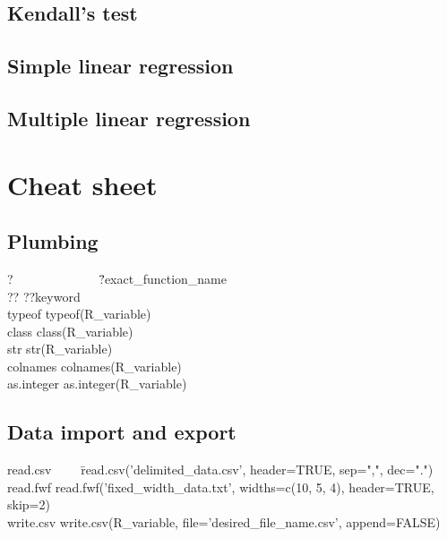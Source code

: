 \documentclass{report}
\begin{document}
	\section{Kendall’s test}
	\section{Simple linear regression}
	\section{Multiple linear regression}

\chapter{Cheat sheet}

	\section{Plumbing}
\begin{tabbing}
?~~~~~~~~~~~~~ \= ?exact\_function\_name \\
?? \> ??keyword \\
typeof \> typeof(R\_variable) \\
class \> class(R\_variable) \\
str \> str(R\_variable) \\
colnames \> colnames(R\_variable) \\
as.integer \> as.integer(R\_variable)
\end{tabbing}

	\section{Data import and export}
\begin{tabbing}
read.csv~~~~ \= read.csv('delimited\_data.csv', header=TRUE, sep=",", dec=".") \\
read.fwf \> read.fwf('fixed\_width\_data.txt', widths=c(10, 5, 4), header=TRUE, skip=2) \\
write.csv \> write.csv(R\_variable, file='desired\_file\_name.csv', append=FALSE)
\end{tabbing}

\printbibliography

\printnoidxglossaries
\end{document}

